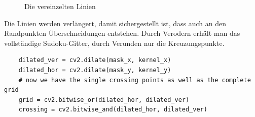 \begin{figure}[H]
    \hfill
    \caption{Die vereinzelten Linien}
\end{figure}

Die Linien werden verlängert, damit sichergestellt ist, dass auch an den Randpunkten Überschneidungen entstehen.
Durch Verodern erhält man das vollständige Sudoku-Gitter, durch Verunden nur die Kreuzungspunkte.

\begin{lstlisting}
    dilated_ver = cv2.dilate(mask_x, kernel_x)
    dilated_hor = cv2.dilate(mask_y, kernel_y)
    # now we have the single crossing points as well as the complete grid
    grid = cv2.bitwise_or(dilated_hor, dilated_ver)
    crossing = cv2.bitwise_and(dilated_hor, dilated_ver)
\end{lstlisting}

